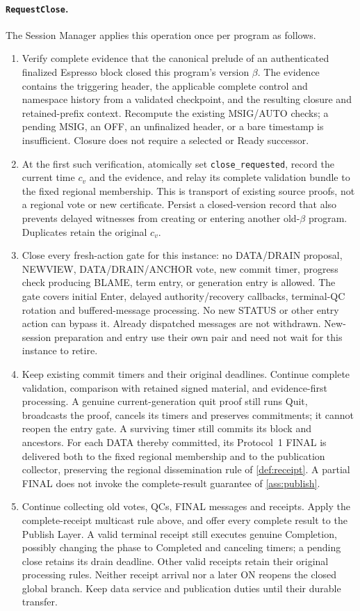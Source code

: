 \paragraph{\texttt{RequestClose}.}
The Session Manager applies this operation once per program as follows.
\begin{enumerate}[label=(\roman*),itemsep=2pt]
\item Verify complete evidence that the canonical prelude of an
authenticated finalized Espresso block closed this program's version
$\beta$. The evidence contains the triggering header, the applicable
complete control and namespace history from a validated checkpoint,
and the resulting closure and retained-prefix context. Recompute the
existing MSIG/AUTO checks; a pending MSIG, an OFF, an unfinalized header,
or a bare timestamp is insufficient. Closure does not require a selected
or Ready successor.
\item At the first such verification, atomically set
\texttt{close\_requested}, record the current time $c_v$ and the evidence,
and relay its complete validation bundle to the fixed regional membership.
This is transport of existing source proofs, not a regional vote or new
certificate. Persist a closed-version record that also prevents delayed
witnesses from creating or entering another old-$\beta$ program.
Duplicates retain the original $c_v$.
\item Close every fresh-action gate for this instance: no DATA/DRAIN
proposal, NEWVIEW, DATA/DRAIN/ANCHOR vote, new commit timer, progress
check producing BLAME, term entry, or generation entry is allowed.
The gate covers initial Enter, delayed authority/recovery callbacks,
terminal-QC rotation and buffered-message processing. No new STATUS
or other entry action can bypass it. Already dispatched messages are
not withdrawn. New-session preparation and entry use their own pair
and need not wait for this instance to retire.
\item Keep existing commit timers and their original deadlines.
Continue complete validation, comparison with retained signed material,
and evidence-first processing. A genuine current-generation quit proof
still runs Quit, broadcasts the proof, cancels its timers and preserves
commitments; it cannot reopen the entry gate. A surviving timer still
commits its block and ancestors. For each DATA thereby committed, its
Protocol~1 FINAL is delivered both to the fixed regional membership and
to the publication collector, preserving the regional dissemination rule
of \cref{def:receipt}. A partial FINAL does not invoke the complete-result
guarantee of \cref{ass:publish}.
\item Continue collecting old votes, QCs, FINAL messages and receipts.
Apply the complete-receipt multicast rule above, and offer every
complete result to the Publish Layer. A valid terminal
receipt still executes genuine Completion, possibly changing the phase
to Completed and canceling timers; a pending close retains its drain
deadline. Other valid receipts retain their original processing rules.
Neither receipt arrival nor a later ON reopens the closed global branch.
Keep data service and publication duties until their durable transfer.
\end{enumerate}
